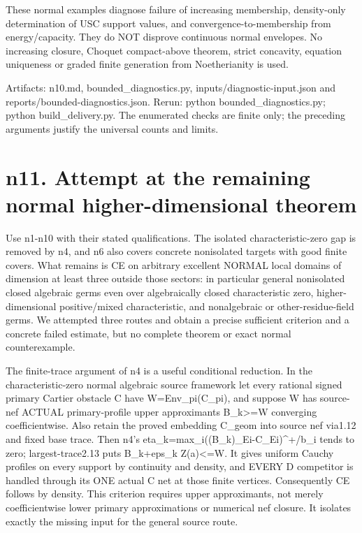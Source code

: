 \documentclass[11pt]{article}
\begin{document}
These normal examples diagnose failure of increasing membership, density-only determination of USC support values, and convergence-to-membership from energy/capacity. They do NOT disprove continuous normal envelopes. No increasing closure, Choquet compact-above theorem, strict concavity, equation uniqueness or graded finite generation from Noetherianity is used.

Artifacts: n10.md, bounded\_diagnostics.py, inputs/diagnostic-input.json and reports/bounded-diagnostics.json. Rerun: python bounded\_diagnostics.py; python build\_delivery.py. The enumerated checks are finite only; the preceding arguments justify the universal counts and limits.


\section*{n11. Attempt at the remaining normal higher-dimensional theorem}

Use n1-n10 with their stated qualifications. The isolated characteristic-zero gap is removed by n4, and n6 also covers concrete nonisolated targets with good finite covers. What remains is CE on arbitrary excellent NORMAL local domains of dimension at least three outside those sectors: in particular general nonisolated closed algebraic germs even over algebraically closed characteristic zero, higher-dimensional positive/mixed characteristic, and nonalgebraic or other-residue-field germs. We attempted three routes and obtain a precise sufficient criterion and a concrete failed estimate, but no complete theorem or exact normal counterexample.

The finite-trace argument of n4 is a useful conditional reduction. In the characteristic-zero normal algebraic source framework let every rational signed primary Cartier obstacle C have W=Env\_pi(C\_pi), and suppose W has source-nef ACTUAL primary-profile upper approximants B\_k>=W converging coefficientwise. Also retain the proved embedding C\_geom into source nef via1.12 and fixed base trace. Then n4's eta\_k=max\_i((B\_k)\_Ei-C\_Ei)\textasciicircum{}+/b\_i tends to zero; largest-trace2.13 puts B\_k+eps\_k Z(a)<=W. It gives uniform Cauchy profiles on every support by continuity and density, and EVERY D competitor is handled through its ONE actual C net at those finite vertices. Consequently CE follows by density. This criterion requires upper approximants, not merely coefficientwise lower primary approximations or numerical nef closure. It isolates exactly the missing input for the general source route.
\end{document}
